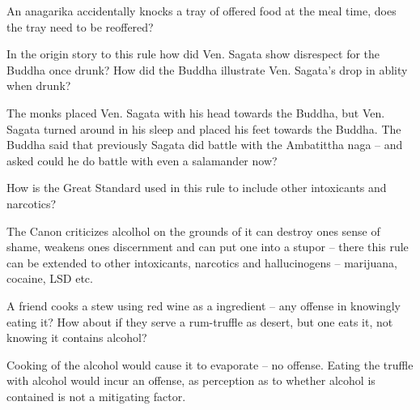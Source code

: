 An anagarika accidentally knocks a tray of offered food at the meal time, does
the tray need to be reoffered?

\bigskip


In the origin story to this rule how did Ven. Sagata show disrespect for the
Buddha once drunk? How did the Buddha illustrate Ven. Sagata’s drop in ablity
when drunk?

\begin{solution}
  The monks placed Ven. Sagata with his head towards the Buddha, but Ven. Sagata
  turned around in his sleep and placed his feet towards the Buddha. The Buddha
  said that previously Sagata did battle with the Ambatittha naga – and asked
  could he do battle with even a salamander now?
\end{solution}

\bigskip

How is the Great Standard used in this rule to include other intoxicants and narcotics?

\begin{solution}
  The Canon criticizes alcolhol on the grounds of it can destroy ones sense of
  shame, weakens ones discernment and can put one into a stupor – there this
  rule can be extended to other intoxicants, narcotics and hallucinogens –
  marijuana, cocaine, LSD etc.
\end{solution}

\bigskip

A friend cooks a stew using red wine as a ingredient – any offense in knowingly
eating it? How about if they serve a rum-truffle as desert, but one eats it, not
knowing it contains alcohol?

\begin{solution}
  Cooking of the alcohol would cause it to evaporate -- no offense. Eating the
  truffle with alcohol would incur an offense, as perception as to whether
  alcohol is contained is not a mitigating factor.
\end{solution}

\bigskip


